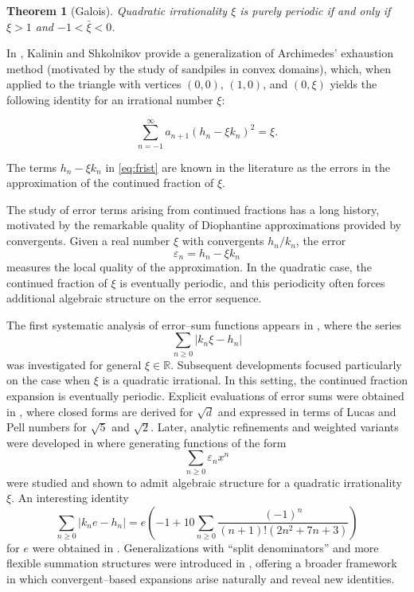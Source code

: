 \documentclass[]{interact}
\theoremstyle{plain}
\numberwithin{equation}{section} %
\newtheorem{theorem}[thm]{Theorem}
\numberwithin{table}{section} %
\numberwithin{figure}{section}
\begin{document}
\begin{theorem}[Galois]\label{th2}
 Quadratic irrationality $\xi$ is purely periodic if and only if $\xi>1$ and $-1<\bar{\xi} <0$. 

\end{theorem}



In \cite{kalinin2019tropical,kalinin2024legendre}, Kalinin and Shkolnikov provide a generalization of Archimedes' exhaustion method (motivated by the study of sandpiles in convex domains), which, when applied to the triangle with vertices $(0,0)$, $(1,0)$, and $(0,\xi)$ yields the following identity for  an irrational number $\xi$:        


\begin{equation}
\sum_{n=-1}^{\infty}a_{n+1}(h_n-\xi k_n)^2=\xi. 
\label{eq:frist}
\end{equation}





The terms $h_n-\xi k_n$ in \eqref{eq:frist} are known in the literature as the errors in the approximation of the continued fraction of $\xi$. 

The study of error terms arising from continued fractions has a long history,
motivated by the remarkable quality of Diophantine approximations provided by
convergents. Given a real number \(\xi\) with convergents \(h_n/k_n\), the error
\[
\varepsilon_n=h_n-\xi k_n
\]
measures the local quality of the approximation. In the quadratic case, the
continued fraction of \(\xi\) is eventually periodic, and this periodicity often
forces additional algebraic structure on the error sequence.

The first systematic analysis of error–sum functions appears in 
\cite{ridley2000error},
where the series
\[
   \sum_{n\ge0} |k_n \xi - h_n|
\]
was investigated for general $\xi\in\mathbb R$.
Subsequent developments focused particularly on the case when $\xi$ is a
quadratic irrational.  In this setting, the continued fraction expansion is
eventually periodic.  Explicit evaluations of error sums were obtained  
in \cite{elsner2014error}, where closed forms are 
derived for $\sqrt d$ and expressed in terms of Lucas and Pell numbers for $\sqrt 5$ and $\sqrt 2$.
Later, analytic refinements and weighted variants were developed in \cite{elsner2011error}
where generating functions
of the form
\[
   \sum_{n\ge0} \varepsilon_n x^n
\]
were studied and shown to admit algebraic structure for a quadratic irrationality $\xi$. An interesting identity 
$$\sum_{n\geq 0}|k_ne-h_n|=e\left(-1+10\sum_{n\geq 0}\frac{(-1)^n}{(n+1)!(2n^2+7n+3)}\right)$$
for $e$ were obtained in \cite{allouche2014variations}. 
Generalizations with ``split denominators'' and more flexible summation
structures were introduced in \cite{baruchel2016error},
offering a broader framework in which convergent--based expansions arise
naturally and reveal new identities.
\end{document}
